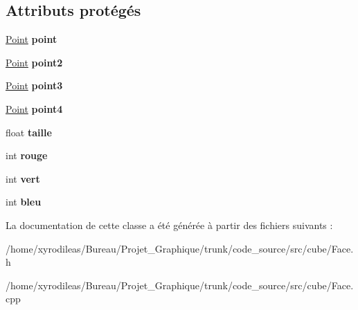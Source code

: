 \subsection*{Attributs protégés}
\begin{DoxyCompactItemize}
\item 
\hypertarget{classFace_a6347208958acabe7c1e07660a8016991}{\hyperlink{classPoint}{Point} {\bfseries point}}\label{classFace_a6347208958acabe7c1e07660a8016991}

\item 
\hypertarget{classFace_a53180d3d69a7e064b5a98e84314f73c2}{\hyperlink{classPoint}{Point} {\bfseries point2}}\label{classFace_a53180d3d69a7e064b5a98e84314f73c2}

\item 
\hypertarget{classFace_a7928a2f75a5e4cb7909e3decf0a1953f}{\hyperlink{classPoint}{Point} {\bfseries point3}}\label{classFace_a7928a2f75a5e4cb7909e3decf0a1953f}

\item 
\hypertarget{classFace_ad3d69dea20bb9f184f83d80cb0f1fa48}{\hyperlink{classPoint}{Point} {\bfseries point4}}\label{classFace_ad3d69dea20bb9f184f83d80cb0f1fa48}

\item 
\hypertarget{classFace_aaa3a01311d47934fd138dfa96577ec5f}{float {\bfseries taille}}\label{classFace_aaa3a01311d47934fd138dfa96577ec5f}

\item 
\hypertarget{classFace_a238c37178677fda653c8c920fb1d89f8}{int {\bfseries rouge}}\label{classFace_a238c37178677fda653c8c920fb1d89f8}

\item 
\hypertarget{classFace_aef0c098bf7cbc066932af4ea70e41a28}{int {\bfseries vert}}\label{classFace_aef0c098bf7cbc066932af4ea70e41a28}

\item 
\hypertarget{classFace_a21c11d58e4871810e257ae729ca8c9fb}{int {\bfseries bleu}}\label{classFace_a21c11d58e4871810e257ae729ca8c9fb}

\end{DoxyCompactItemize}


La documentation de cette classe a été générée à partir des fichiers suivants \-:\begin{DoxyCompactItemize}
\item 
/home/xyrodileas/\-Bureau/\-Projet\-\_\-\-Graphique/trunk/code\-\_\-source/src/cube/Face.\-h\item 
/home/xyrodileas/\-Bureau/\-Projet\-\_\-\-Graphique/trunk/code\-\_\-source/src/cube/Face.\-cpp\end{DoxyCompactItemize}
